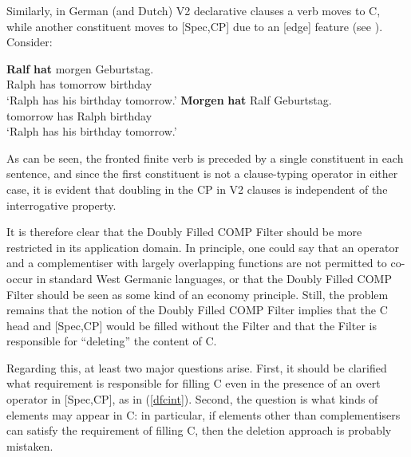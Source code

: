 Similarly, in German (and Dutch) V2 declarative clauses a verb moves to C, while another constituent moves to [Spec,CP] due to an [edge] feature (see \citealt{thiersch1978diss, denbesten1989, fanselow2002, fanselow2004isis, fanselow2004, frey2005}). Consider:

\ea \label{v2}
\ea \gll \textbf{Ralf} \textbf{hat} morgen Geburtstag.\\
Ralph has tomorrow birthday\\
\glt `Ralph has his birthday tomorrow.'
\ex \gll \textbf{Morgen} \textbf{hat} Ralf Geburtstag.\\
tomorrow has Ralph birthday\\
\glt `Ralph has his birthday tomorrow.'
\z
\z

As can be seen, the fronted finite verb is preceded by a single constituent in each sentence, and since the first constituent is not a clause-typing operator in either case, it is evident that doubling in the CP in V2 clauses is independent of the interrogative property.

It is therefore clear that the Doubly Filled COMP Filter should be more restricted in its application domain. In principle, one could say that an operator and a complementiser with largely overlapping functions are not permitted to co-occur in standard West Germanic languages, or that the Doubly Filled COMP Filter should be seen as some kind of an economy principle. Still, the problem remains that the notion of the Doubly Filled COMP Filter implies that the C head and [Spec,CP] would be filled without the Filter and that the Filter is responsible for ``deleting'' the content of C. 

Regarding this, at least two major questions arise. First, it should be clarified what requirement is responsible for filling C even in the presence of an overt operator in [Spec,CP], as in (\ref{dfcint}). Second, the question is what kinds of elements may appear in C: in particular, if elements other than complementisers can satisfy the requirement of filling C, then the deletion approach is probably mistaken.

